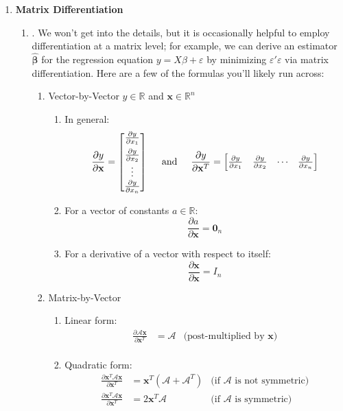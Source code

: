 \documentclass[12pt]{article}
\begin{document}
\begin{enumerate}
\item\textbf{Matrix Differentiation}
	\begin{enumerate}
	\item\underline{}.
		We won't get into the details, but it is occasionally helpful to employ differentiation at a
		matrix level; for example, we can derive an estimator $\widehat{\boldsymbol{\beta}}$ for the regression equation
		$y=X\beta+\varepsilon$ by minimizing $\varepsilon'\varepsilon$ via matrix differentiation. Here
		are a few of the formulas you'll likely run across:
		\begin{enumerate}
		\item Vector-by-Vector $y \in \mathbb{R}$ and $\mathbf{x} \in \mathbb{R}^n$
			\begin{enumerate}
			\item In general:
				\[\frac{\partial y}{\partial\mathbf{x}}=
				\begin{bmatrix}
				\frac{\partial y}{\partial x_1} \\[5pt]
				\frac{\partial y}{\partial x_2} \\
				\vdots \\ 
				\frac{\partial y}{\partial x_n} \\
				\end{bmatrix}  \hspace{5mm} \text{and} \hspace{5mm} 
				\frac{\partial y}{\partial\mathbf{x}^T}=
				\begin{bmatrix}
				\frac{\partial y}{\partial x_1} &
				\frac{\partial y}{\partial x_2} &
				\cdots &
				\frac{\partial y}{\partial x_n}
				\end{bmatrix}\] 
			\item For a vector of constants $a \in \mathbb{R}$:
				\[\frac{\partial a}{\partial \mathbf{x}}=\mathbf{0}_n\]
			\item For a derivative of a vector with respect to itself:
				\[\frac{\partial\mathbf{x}}{\partial\mathbf{x}}=I_n\]
			\end{enumerate}
		\item Matrix-by-Vector
			\begin{enumerate}
			\item Linear form:
				\begin{align*}
				\frac{\partial \mathcal{A}\mathbf{x}}{\partial\mathbf{x}^T}&=\mathcal{A} 
						&\text{(post-multiplied by $\mathbf{x}$)}\\
				\end{align*}
			\item Quadratic form:
				\begin{align*}
				\frac{\partial\mathbf{x}^T\mathcal{A}\mathbf{x}}{\partial\mathbf{x}^T}&=\mathbf{x}^T (\mathcal{A} + \mathcal{A}^T) 
						&\text{(if $\mathcal{A}$ is not symmetric)}\\[5pt]
				\frac{\partial\mathbf{x}^T \mathcal{A}\mathbf{x}}{\partial\mathbf{x}^T}&=2\mathbf{x}^T\mathcal{A}
						&\text{(if $\mathcal{A}$ is symmetric)}
				\end{align*}
			\end{enumerate}
		\end{enumerate}
	

\end{enumerate}
\end{enumerate}
\end{document}
